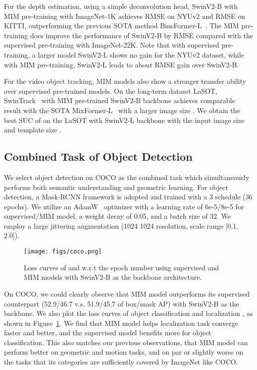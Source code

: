 \documentclass{article}
\begin{document}
	For the depth estimation, using a simple deconvolution head, SwinV2-B with MIM pre-training with ImageNet-1K achieves  RMSE on NYUv2 and  RMSE on KITTI, outperforming the previous SOTA method BinsFormer-L~\cite{li2022binsdepth}.
	The MIM pre-training does improve the performance of SwinV2-B by  RMSE compared with the supervised pre-training with ImageNet-22K. Note that with supervised pre-training, a larger model SwinV2-L shows no gain for the NYUv2 dataset, while with MIM pre-training, SwinV2-L leads to about  RMSE gain over SwinV2-B.
	
	For the video object tracking, MIM models also show a stronger transfer ability over supervised pre-trained models. On the long-term dataset LaSOT, SwinTrack~\cite{lin2021swintrack} with MIM pre-trained SwinV2-B backbone achieves comparable result with the SOTA MixFormer-L~\cite{cui2022mixfmr} with a larger image size . We obtain the best SUC of  on the LaSOT with SwinV2-L backbone with the input image size  and template size .
	
	
\subsection{Combined Task of Object Detection}

We select object detection on COCO as the combined task which simultaneously performs both semantic understanding and geometric learning. 
For object detection, a Mask-RCNN\cite{Mask-rcnn} framework is adopted and trained with a 3  schedule (36 epochs). We utilize an AdamW~\cite{kingma2014adam} optimizer with a learning rate of 6e-5/8e-5 for supervised/MIM model, a weight decay of 0.05, and a batch size of 32. We employ a large jittering augmentation (1024  1024 resolution, scale range [0.1, 2.0]). 


\begin{figure}
    \centering
    \texttt{[image: figs/coco.png]}
    \vspace{-20pt}
    \caption{Loss curves of  and  w.r.t the epoch number using supervised and MIM models with SwinV2-B as the backbone architecture.}
    \label{fig:det_loss}
\end{figure}

On COCO, we could clearly observe that MIM model outperforms its supervised counterpart (52.9/46.7 v.s. 51.9/45.7  of box/mask AP) with SwinV2-B as the backbone. We also plot the loss curves of object classification  and localization , as shown in Figure~\ref{fig:det_loss}. We find that MIM model helps localization task converge faster and better, and the supervised model benefits more for object classification. This also matches our previous observations, that MIM model can perform better on geometric and motion tasks, and on par or slightly worse on the tasks that its categories are sufficiently covered by ImageNet like COCO. 
\end{document}
